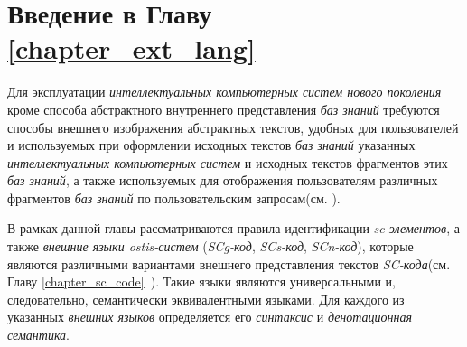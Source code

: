 \section*{Введение в Главу \ref{chapter_ext_lang}}

Для эксплуатации \textit{интеллектуальных компьютерных систем нового поколения} кроме способа абстрактного внутреннего представления \textit{баз знаний} требуются способы внешнего изображения абстрактных текстов, удобных для пользователей и используемых при оформлении исходных текстов \textit{баз знаний} указанных \textit{интеллектуальных компьютерных систем} и исходных текстов фрагментов этих \textit{баз знаний}, а также используемых для отображения пользователям различных фрагментов \textit{баз знаний} по пользовательским запросам(см. ).

В рамках данной главы рассматриваются правила идентификации \textit{sc-элементов}, а также \textit{внешние языки ostis-систем} (\textit{SCg-код}, \textit{SCs-код}, \textit{SCn-код}), которые являются различными вариантами внешнего представления текстов \textit{SC-кода}(см. Главу \ref{chapter_sc_code}~). Такие языки являются универсальными и, следовательно, семантически эквивалентными языками. Для каждого из указанных \textit{внешних языков} определяется его \textit{синтаксис} и \textit{денотационная семантика}.

